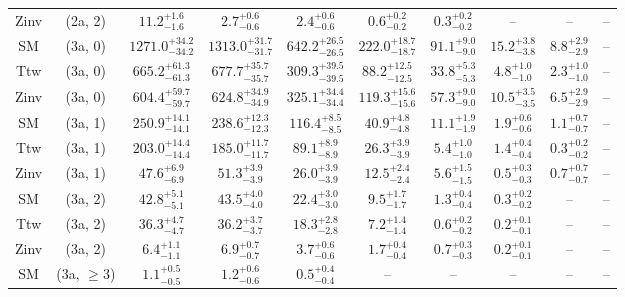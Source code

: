 \begin{table}[h!]
{\begin{tabular}{cccccccccc}
	Zinv & (2a, 2) & $11.2^{+ 1.6 }_{- 1.6 }$ & $2.7^{+ 0.6 }_{- 0.6 }$ & $2.4^{+ 0.6 }_{- 0.6 }$ & $0.6^{+ 0.2 }_{- 0.2 }$ & $0.3^{+ 0.2 }_{- 0.2 }$ & -- & -- & -- \\[0.5ex] 
	SM & (3a, 0) & $1271.0^{+ 34.2 }_{- 34.2 }$ & $1313.0^{+ 31.7 }_{- 31.7 }$ & $642.2^{+ 26.5 }_{- 26.5 }$ & $222.0^{+ 18.7 }_{- 18.7 }$ & $91.1^{+ 9.0 }_{- 9.0 }$ & $15.2^{+ 3.8 }_{- 3.8 }$ & $8.8^{+ 2.9 }_{- 2.9 }$ & -- \\[0.5ex] 
	Ttw & (3a, 0) & $665.2^{+ 61.3 }_{- 61.3 }$ & $677.7^{+ 35.7 }_{- 35.7 }$ & $309.3^{+ 39.5 }_{- 39.5 }$ & $88.2^{+ 12.5 }_{- 12.5 }$ & $33.8^{+ 5.3 }_{- 5.3 }$ & $4.8^{+ 1.0 }_{- 1.0 }$ & $2.3^{+ 1.0 }_{- 1.0 }$ & -- \\[0.5ex] 
	Zinv & (3a, 0) & $604.4^{+ 59.7 }_{- 59.7 }$ & $624.8^{+ 34.9 }_{- 34.9 }$ & $325.1^{+ 34.4 }_{- 34.4 }$ & $119.3^{+ 15.6 }_{- 15.6 }$ & $57.3^{+ 9.0 }_{- 9.0 }$ & $10.5^{+ 3.5 }_{- 3.5 }$ & $6.5^{+ 2.9 }_{- 2.9 }$ & -- \\[0.5ex] 
	SM & (3a, 1) & $250.9^{+ 14.1 }_{- 14.1 }$ & $238.6^{+ 12.3 }_{- 12.3 }$ & $116.4^{+ 8.5 }_{- 8.5 }$ & $40.9^{+ 4.8 }_{- 4.8 }$ & $11.1^{+ 1.9 }_{- 1.9 }$ & $1.9^{+ 0.6 }_{- 0.6 }$ & $1.1^{+ 0.7 }_{- 0.7 }$ & -- \\[0.5ex] 
	Ttw & (3a, 1) & $203.0^{+ 14.4 }_{- 14.4 }$ & $185.0^{+ 11.7 }_{- 11.7 }$ & $89.1^{+ 8.9 }_{- 8.9 }$ & $26.3^{+ 3.9 }_{- 3.9 }$ & $5.4^{+ 1.0 }_{- 1.0 }$ & $1.4^{+ 0.4 }_{- 0.4 }$ & $0.3^{+ 0.2 }_{- 0.2 }$ & -- \\[0.5ex] 
	Zinv & (3a, 1) & $47.6^{+ 6.9 }_{- 6.9 }$ & $51.3^{+ 3.9 }_{- 3.9 }$ & $26.0^{+ 3.9 }_{- 3.9 }$ & $12.5^{+ 2.4 }_{- 2.4 }$ & $5.6^{+ 1.5 }_{- 1.5 }$ & $0.5^{+ 0.3 }_{- 0.3 }$ & $0.7^{+ 0.7 }_{- 0.7 }$ & -- \\[0.5ex] 
	SM & (3a, 2) & $42.8^{+ 5.1 }_{- 5.1 }$ & $43.5^{+ 4.0 }_{- 4.0 }$ & $22.4^{+ 3.0 }_{- 3.0 }$ & $9.5^{+ 1.7 }_{- 1.7 }$ & $1.3^{+ 0.4 }_{- 0.4 }$ & $0.3^{+ 0.2 }_{- 0.2 }$ & -- & -- \\[0.5ex] 
	Ttw & (3a, 2) & $36.3^{+ 4.7 }_{- 4.7 }$ & $36.2^{+ 3.7 }_{- 3.7 }$ & $18.3^{+ 2.8 }_{- 2.8 }$ & $7.2^{+ 1.4 }_{- 1.4 }$ & $0.6^{+ 0.2 }_{- 0.2 }$ & $0.2^{+ 0.1 }_{- 0.1 }$ & -- & -- \\[0.5ex] 
	Zinv & (3a, 2) & $6.4^{+ 1.1 }_{- 1.1 }$ & $6.9^{+ 0.7 }_{- 0.7 }$ & $3.7^{+ 0.6 }_{- 0.6 }$ & $1.7^{+ 0.4 }_{- 0.4 }$ & $0.7^{+ 0.3 }_{- 0.3 }$ & $0.2^{+ 0.1 }_{- 0.1 }$ & -- & -- \\[0.5ex] 
	SM & (3a, $\ge3$) & $1.1^{+ 0.5 }_{- 0.5 }$ & $1.2^{+ 0.6 }_{- 0.6 }$ & $0.5^{+ 0.4 }_{- 0.4 }$ & -- & -- & -- & -- & -- \\[0.5ex] 

\end{tabular}}
\end{table}
